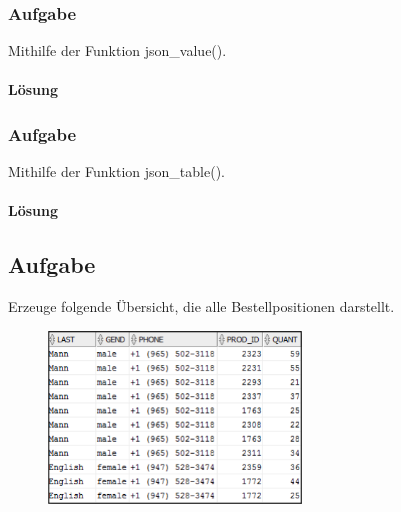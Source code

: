 \subsubsection{Aufgabe}
\label{sec:uebung_10.aufgabe_01a}
Mithilfe der Funktion json\_value().

\paragraph*{Lösung}
\label{sec:uebung_10.aufgabe_01a.loesung}


\subsubsection{Aufgabe}
\label{sec:uebung_10.aufgabe_01b}
Mithilfe der Funktion json\_table().

\paragraph*{Lösung}
\label{sec:uebung_10.aufgabe_01b.loesung}


\subsection{Aufgabe}
\label{sec:uebung_10.aufgabe_02}
Erzeuge folgende Übersicht, die alle Bestellpositionen darstellt.

\begin{figure}[H]
  \centering
  \includegraphics[width=0.6\textwidth]{img//uebung_10_-_aufgabe_02.png}
  \label{img:uebung_10_-_aufgabe_02}
\end{figure}

